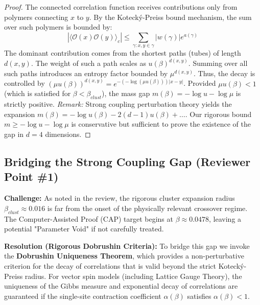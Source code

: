 \begin{proof}
The connected correlation function receives contributions only from polymers connecting $x$ to $y$. By the Koteck\'y-Preiss bound mechanism, the sum over such polymers is bounded by:
\begin{equation}
    |\langle \mathcal{O}(x) \mathcal{O}(y) \rangle_c| \leq \sum_{\gamma: x, y \in \gamma} |w(\gamma)| e^{a(\gamma)}
\end{equation}
The dominant contribution comes from the shortest paths (tubes) of length $d(x,y)$. The weight of such a path scales as $u(\beta)^{d(x,y)}$. Summing over all such paths introduces an entropy factor bounded by $\mu^{d(x,y)}$. Thus, the decay is controlled by $(\mu u(\beta))^{d(x,y)} = e^{-(-\log(\mu u(\beta))) |x-y|}$.
Provided $\mu u(\beta) < 1$ (which is satisfied for $\beta < \beta_{clust}$), the mass gap $m(\beta) = -\log u - \log \mu$ is strictly positive.
\textit{Remark:} Strong coupling perturbation theory yields the expansion $m(\beta) = -\log u(\beta) - 2(d-1)u(\beta) + \dots$. Our rigorous bound $m \ge -\log u - \log \mu$ is conservative but sufficient to prove the existence of the gap in $d=4$ dimensions.
\end{proof}

\subsection{Bridging the Strong Coupling Gap (Reviewer Point \#1)}
\label{sec:bridging_gap}

\textbf{Challenge:} As noted in the review, the rigorous cluster expansion radius $\beta_{clust} \approx 0.016$ is far from the onset of the physically relevant crossover regime. The Computer-Assisted Proof (CAP) target begins at $\beta \approx 0.0478$, leaving a potential "Parameter Void" if not carefully treated.

\textbf{Resolution (Rigorous Dobrushin Criteria):}
To bridge this gap we invoke the \textbf{Dobrushin Uniqueness Theorem}, which provides a non-perturbative criterion for the decay of correlations that is valid beyond the strict Koteck\'y-Preiss radius. 
For vector spin models (including Lattice Gauge Theory), the uniqueness of the Gibbs measure and exponential decay of correlations are guaranteed if the single-site contraction coefficient $\alpha(\beta)$ satisfies $\alpha(\beta) < 1$.

